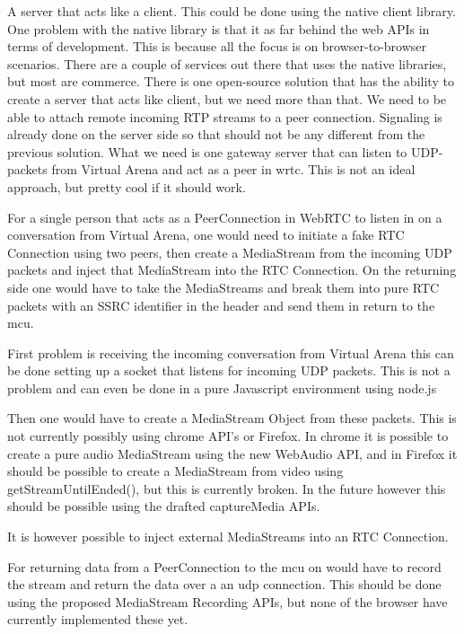 A server that acts like a client. This could be done using the native client library. One problem with the native library is that it as far behind the web APIs in terms of development. This is because all the focus is on browser-to-browser scenarios. There are a couple of services out there that uses the native libraries, but most are commerce. There is one open-source solution that has the ability to create a server that acts like client, but we need more than that. We need to be able to attach remote incoming RTP streams to a peer connection. Signaling is already done on the server side so that should not be any different from the previous solution. What we need is one gateway server that can listen to UDP-packets from Virtual Arena and act as a peer in \gls{wrtc}. This is not an ideal approach, but pretty cool if it should work.

For a single person that acts as a PeerConnection in WebRTC to listen in on a conversation from Virtual Arena, one would need to initiate a fake RTC Connection using two peers, then create a MediaStream from the incoming UDP packets and inject that MediaStream into the RTC Connection. On the returning side one would have to take the MediaStreams and break them into pure RTC packets with an SSRC identifier in the header and send them in return to the \gls{mcu}.

First problem is receiving the incoming conversation from Virtual Arena this can be done setting up a socket that listens for incoming UDP packets. This is not a problem and can even be done in a pure Javascript environment using node.js

Then one would have to create a MediaStream Object from these packets. This is not currently possibly using chrome API's or Firefox. In chrome it is possible to create a pure audio MediaStream using the new WebAudio API, and in Firefox it should be possible to create a MediaStream from video using getStreamUntilEnded(), but this is currently broken. In the future however this should be possible using the drafted captureMedia APIs.

It is however possible to inject external MediaStreams into an RTC Connection.

For returning data from a PeerConnection to the \gls{mcu} on would have to record the stream and return the data over a an \gls{udp} connection. This should be done using the proposed MediaStream Recording APIs, but none of the browser have currently implemented these yet.